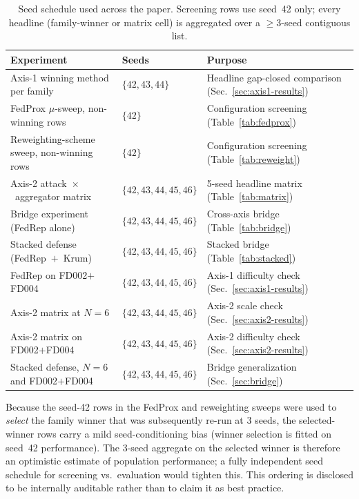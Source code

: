 \documentclass[a4paper,fleqn,doubleblind]{cas-sc}
\newcommand{\tblhead}{\rowcolor{tblHeadBg}}
\newcommand{\zebra}{\rowcolors{2}{tblAltBg}{white}}
\newcommand{\tblhead}{}
\newcommand{\zebra}{}
\begin{document}
\begin{table}[pos=tbp]
\centering
\footnotesize
\setlength{\tabcolsep}{6pt}
\renewcommand{\arraystretch}{1.15}
\caption{Seed schedule used across the paper. Screening rows use
seed~42 only; every headline (family-winner or matrix cell) is
aggregated over a $\geq 3$-seed contiguous list.}
\label{tab:seed-usage}
\zebra
\begin{tabular}{@{}l l l@{}}
\toprule
\tblhead
Experiment & Seeds & Purpose \\
\midrule
Axis-1 winning method per family        & $\{42, 43, 44\}$      & Headline gap-closed comparison (Sec.~\ref{sec:axis1-results}) \\
FedProx $\mu$-sweep, non-winning rows   & $\{42\}$              & Configuration screening (Table~\ref{tab:fedprox}) \\
Reweighting-scheme sweep, non-winning rows & $\{42\}$           & Configuration screening (Table~\ref{tab:reweight}) \\
Axis-2 attack~$\times$~aggregator matrix   & $\{42, 43, 44, 45, 46\}$ & 5-seed headline matrix (Table~\ref{tab:matrix}) \\
Bridge experiment (FedRep alone)        & $\{42, 43, 44, 45, 46\}$ & Cross-axis bridge (Table~\ref{tab:bridge}) \\
Stacked defense (FedRep~$+$~Krum)       & $\{42, 43, 44, 45, 46\}$ & Stacked bridge (Table~\ref{tab:stacked}) \\
\midrule
FedRep on FD002$+$FD004                  & $\{42, 43, 44, 45, 46\}$ & Axis-1 difficulty check (Sec.~\ref{sec:axis1-results}) \\
Axis-2 matrix at $N = 6$                 & $\{42, 43, 44, 45, 46\}$ & Axis-2 scale check (Sec.~\ref{sec:axis2-results}) \\
Axis-2 matrix on FD002$+$FD004           & $\{42, 43, 44, 45, 46\}$ & Axis-2 difficulty check (Sec.~\ref{sec:axis2-results}) \\
Stacked defense, $N{=}6$ and FD002$+$FD004 & $\{42, 43, 44, 45, 46\}$ & Bridge generalization (Sec.~\ref{sec:bridge}) \\
\bottomrule
\end{tabular}
\end{table}

Because the seed-42 rows in the FedProx and reweighting sweeps were
used to \emph{select} the family winner that was subsequently
re-run at 3 seeds, the selected-winner rows carry a mild
seed-conditioning bias (winner selection is fitted on seed~42
performance). The 3-seed aggregate on the selected winner is
therefore an optimistic estimate of population performance; a fully
independent seed schedule for screening vs.\ evaluation would
tighten this. This ordering is disclosed to be internally auditable
rather than to claim it as best practice.
\end{document}
